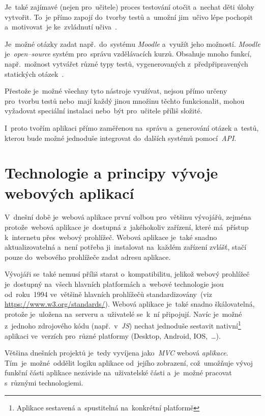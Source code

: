 \documentclass[11pt,a4paper]{report}
\let\oldacrshort\acrshort
\renewcommand{\acrshort}[1]{\emph{\normalsize\color[rgb]{0,0,0}\noindent\oldacrshort{#1}}}
\begin{document}
            Je~také zajímavé (nejen pro~učitele) proces testování otočit a~nechat děti úlohy vytvořit. To~je přímo zapojí do~tvorby testů a~umožní jim~učivo lépe pochopit a~motivovat~je ke~zvládnutí učiva~\cite{hedlovam:chybavresenim}.

            Je~možné otázky zadat např.~do~systému \emph{Moodle} a~využít jeho možností. \emph{Moodle} je~\emph{open--source} systém pro~správu vzdělávacích kurzů. Obsahuje mnoho funkcí, např.~možnost vytvářet různé typy testů, vygenerovaných z~předpřipravených statických otázek~\cite{drlik2013moodle}.

            Přestože je~možné všechny tyto nástroje využívat, nejsou přímo určeny pro~tvorbu testů nebo~mají každý jinou množinu těchto funkcionalit, mohou vyžadovat speciální instalaci nebo~být pro~učitele příliš složité.
            
            I~proto tvořím aplikaci přímo zaměřenou na~správu a~generování otázek a~testů, kterou bude možné jednoduše integrovat do~dalších systémů pomocí~\acrshort{API}.

    \chapter{Technologie a principy vývoje webových aplikací}
        V~dnešní době je~webová aplikace první volbou pro~většinu vývojářů, zejména protože~webová aplikace je~dostupná z~jakéhokoliv zařízení, které má~přístup k~internetu přes~webový prohlížeč. Webová aplikace je~také snadno aktualizovatelná a~není potřeba ji~instalovat na~každém zařízení zvlášť, stačí pouze do~webového prohlížeče zadat adresu aplikace.
        
        Vývojáři se~také nemusí příliš starat o~kompatibilitu, jelikož webový prohlížeč je~dostupný na~všech hlavních platformách a~webové technologie jsou od~roku~1994 ve~většině hlavních prohlížečů standardizovány~(viz \url{https://www.w3.org/standards/}). Webová aplikace je~také snadno škálovatelná, protože je~uložena na~serveru a~uživatelé se~k~ní připojují. Navíc je~možné z~jednoho zdrojového kódu (např.~v~\acrshort{JS}) nechat jednoduše sestavit nativní\footnote{Aplikace sestavená a~spustitelná na~konkrétní platformě} aplikaci ve~verzích pro~různé platformy (Desktop, Android, IOS,~\dots).~\cite{adobe:webapp}

        Většina dnešních projektů je~tedy vyvíjena jako~\emph{MVC} webová \emph{aplikace}. Tím~je~možné~oddělit logiku aplikace od~jejího zobrazení, což~umožňuje vývoj funkční části aplikace nezávisle na~uživatelské části a~je~možné pracovat s~různými technologiemi.
        
\end{document}
